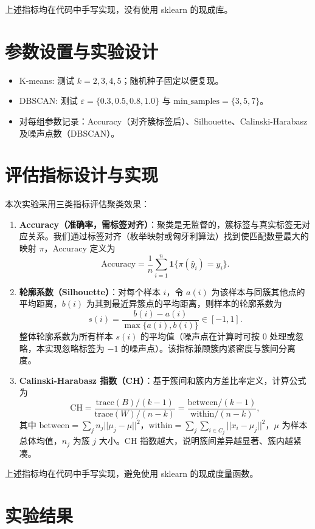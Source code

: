 上述指标均在代码中手写实现，没有使用 sklearn 的现成库。


\section{参数设置与实验设计}
\begin{itemize}
    \item K-means: 测试 $k=2,3,4,5$；随机种子固定以便复现。
    \item DBSCAN: 测试 $\varepsilon=\{0.3,0.5,0.8,1.0\}$ 与 $\mathrm{min\_samples}=\{3,5,7\}$。
    \item 对每组参数记录：Accuracy（对齐簇标签后）、Silhouette、Calinski-Harabasz 及噪声点数（DBSCAN）。
\end{itemize}

\section{评估指标设计与实现}
本次实验采用三类指标评估聚类效果：
\begin{enumerate}
    \item \textbf{Accuracy（准确率，需标签对齐）}：聚类是无监督的，簇标签与真实标签无对应关系。我们通过标签对齐（枚举映射或匈牙利算法）找到使匹配数量最大的映射 $\pi$，Accuracy 定义为
    $$\mathrm{Accuracy} = \frac{1}{n} \sum_{i=1}^n \mathbf{1}\{\pi(\hat{y}_i)=y_i\}.$$ 

    \item \textbf{轮廓系数（Silhouette）}：对每个样本 $i$，令 $a(i)$ 为该样本与同簇其他点的平均距离，$b(i)$ 为其到最近异簇点的平均距离，则样本的轮廓系数为
    $$s(i)=\frac{b(i)-a(i)}{\max\{a(i),b(i)\}}\in[-1,1].$$
    整体轮廓系数为所有样本 $s(i)$ 的平均值（噪声点在计算时可按 0 处理或忽略，本实现忽略标签为 $-1$ 的噪声点）。该指标兼顾簇内紧密度与簇间分离度。

    \item \textbf{Calinski-Harabasz 指数（CH）}：基于簇间和簇内方差比率定义，计算公式为
    $$\mathrm{CH}=\frac{\mathrm{trace}(B)/(k-1)}{\mathrm{trace}(W)/(n-k)}=\frac{\mathrm{between}/(k-1)}{\mathrm{within}/(n-k)},$$
    其中 $\mathrm{between}=\sum_{j} n_j ||\mu_j - \mu||^2$，$\mathrm{within}=\sum_j \sum_{i\in C_j} ||x_i-\mu_j||^2$，$\mu$ 为样本总体均值，$n_j$ 为簇 $j$ 大小。CH 指数越大，说明簇间差异越显著、簇内越紧凑。
\end{enumerate}

上述指标均在代码中手写实现，避免使用 sklearn 的现成度量函数。

\section{实验结果}

